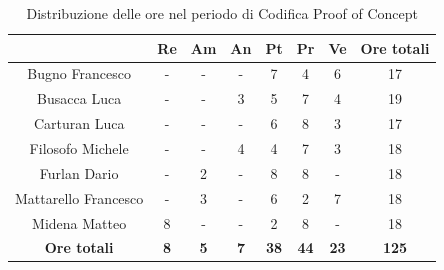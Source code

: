 \begin{table}[H]
  \centering
  \renewcommand{\arraystretch}{1.8}
  \begin{tabular}{c|c|c|c|c|c|c|c}
    \rowcolor[HTML]{125E28}
    \multicolumn{1}{c}{\color[HTML]{FFFFFF}\textbf{ Nominativo }}
                         & \multicolumn{1}{c}{\color[HTML]{FFFFFF}\textbf{ Re }}
                         & \multicolumn{1}{c}{\color[HTML]{FFFFFF}\textbf{ Am}}
                         & \multicolumn{1}{c}{\color[HTML]{FFFFFF}\textbf{ An }}
                         & \multicolumn{1}{c}{\color[HTML]{FFFFFF}\textbf{ Pt }}
                         & \multicolumn{1}{c}{\color[HTML]{FFFFFF}\textbf{ Pr }}
                         & \multicolumn{1}{c}{\color[HTML]{FFFFFF}\textbf{ Ve }}
                         & \multicolumn{1}{c}{\color[HTML]{FFFFFF}\textbf{ Ore totali }}                                                                                    \\
    \hline
    Bugno Francesco      & -                                                             & -          & -          & 7           & 4           & 6           & 17           \\
    Busacca Luca         & -                                                             & -          & 3          & 5           & 7           & 4           & 19           \\
    Carturan Luca        & -                                                             & -          & -          & 6           & 8           & 3           & 17           \\
    Filosofo Michele     & -                                                             & -          & 4          & 4           & 7           & 3           & 18           \\
    Furlan Dario         & -                                                             & 2          & -          & 8           & 8           & -           & 18           \\
    Mattarello Francesco & -                                                             & 3          & -          & 6           & 2           & 7           & 18           \\
    Midena Matteo        & 8                                                             & -          & -          & 2           & 8           & -           & 18           \\
    \textbf{Ore totali}  & \textbf{8}                                                    & \textbf{5} & \textbf{7} & \textbf{38} & \textbf{44} & \textbf{23} & \textbf{125}
  \end{tabular}
  \caption{Distribuzione delle ore nel periodo di Codifica Proof of Concept}
\end{table}


